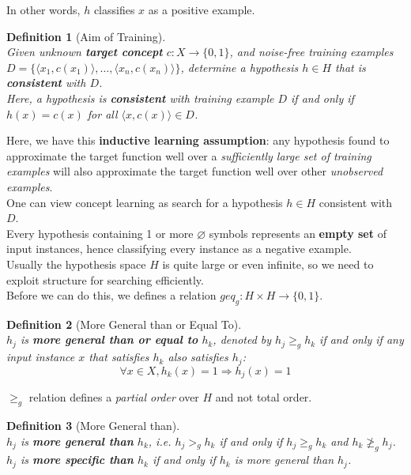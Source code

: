 \documentclass[12pt]{article}
\newtheorem{definition}{Definition}[section]
\theoremstyle{definition}
\begin{document}
In other words, $h$ classifies $x$ as a positive example.\\
\begin{definition}[Aim of Training]
\hfill\\\normalfont Given unknown \textbf{target concept} $c: X\to \{0,1\}$, and \textit{noise-free} training examples $D =  \{\langle x_1, c(x_1)\rangle, \ldots, \langle x_n, c(x_n)\rangle\}$, determine a hypothesis $h\in H$ that is \textbf{consistent} with $D$.\\
Here, a hypothesis is \textbf{consistent} with training example $D$ \textit{if and only if} $h(x)=c(x)$ for all $\langle x, c(x)\rangle\in D$.
\end{definition}
Here, we have this \textbf{inductive learning assumption}: any hypothesis found to approximate the target function well over a \textit{sufficiently large set of training examples} will also approximate the target function well over other \textit{unobserved examples}.\\
One can view concept learning as search for a hypothesis $h\in H$ consistent with $D$.\\
Every hypothesis containing 1 or more $\varnothing$ symbols represents an \textbf{empty set} of input instances, hence classifying every instance as a negative example.\\
Usually the hypothesis space $H$ is quite large or even infinite, so we need to exploit structure for searching efficiently.\\
Before we can do this, we defines a relation $geq_g: H\times H\to \{0,1\}$.
\begin{definition}[More General than or Equal To]
\hfill\\\normalfont $h_j$ is \textbf{more general than or equal to} $h_k$, denoted by $h_j\geq_g h_k$ if and only if any input instance $x$ that satisfies $h_k$ also satisfies $h_j$:
\[
\forall x\in X, h_k(x)=1\Rightarrow h_j(x)=1
\]
\end{definition}
$\geq_g$ relation defines a \textit{partial order} over $H$ and not total order.
\begin{definition}[More General than]
\hfill\\\normalfont $h_j$ is \textbf{more general than} $h_k$, i.e. $h_j>_g h_k$ if and only if $h_j\geq_g h_k$ and $h_k\not\geq_g h_j$.\\
$h_j$ is \textbf{more specific than} $h_k$ if and only if $h_k$ is more general than $h_j$.
\end{definition}
\end{document}
